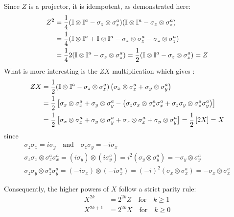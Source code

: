 \documentclass[a4paper,12pt]{article}
\begin{document}
\newpage

Since $ Z $ is a projector, it is idempotent, as demonstrated here: 
\begin{align}
	Z^{2} &= \frac{1}{4} (\mathbb{I} \otimes \mathbb{I}^{a} - \sigma_{z} \otimes \sigma_{z}^{a}) (\mathbb{I} \otimes \mathbb{I}^{a} - \sigma_{z} \otimes \sigma_{z}^{a}) \notag \\
	&= \frac{1}{4} (\mathbb{I} \otimes \mathbb{I}^{a} + \mathbb{I} \otimes \mathbb{I}^{a} - \sigma_{z} \otimes \sigma_{z}^{a} - \sigma_{z} \otimes \sigma_{z}^{a}) \notag \\
	&=  \frac{1}{4} 2 (\mathbb{I} \otimes \mathbb{I}^{a} - \sigma_{z} \otimes \sigma_{z}^{a}) =  \frac{1}{2} (\mathbb{I} \otimes \mathbb{I}^{a} - \sigma_{z} \otimes \sigma_{z}^{a}) = Z
\end{align}
What is more interesting is the $ ZX $ multiplication which gives : 
\begin{align}
	ZX &= \frac{1}{2} (\mathbb{I} \otimes \mathbb{I}^{a} - \sigma_{z} \otimes \sigma_{z}^{a}) \left( \sigma_{x} \otimes \sigma_{x}^{a} + \sigma_{y} \otimes \sigma_{y}^{a} \right) \notag \\
	& = \frac{1}{2} \left[\sigma_{x} \otimes \sigma_{x}^{a} + \sigma_{y} \otimes \sigma_{y}^{a} - \left( \sigma_{z} \sigma_{x} \otimes \sigma_{z}^{a} \sigma_{x}^{a} + \sigma_{z} \sigma_{y} \otimes \sigma_{z}^{a} \sigma_{y}^{a} \right)\right] \notag \\
	& = \frac{1}{2} \left[\sigma_{x} \otimes \sigma_{x}^{a} + \sigma_{y} \otimes \sigma_{y}^{a} + \sigma_{x} \otimes \sigma_{x}^{a} + \sigma_{y} \otimes \sigma_{y}^{a}\right] = \frac{1}{2} \left[2X\right] = X
\end{align}
since 
\begin{gather*}
	\sigma_{z} \sigma_{x} = i \sigma_{y} \quad \text{and} \quad \sigma_{z} \sigma_{y} = -i \sigma_{x} \\
	\sigma_{z}\sigma_{x} \otimes \sigma_{z}^{a}\sigma_{x}^{a} = (i\sigma_{y}) \otimes (i\sigma_{y}^{a}) = i^2 (\sigma_{y} \otimes \sigma_{y}^{a}) = -\sigma_{y} \otimes \sigma_{y}^{a} \\
	\sigma_{z}\sigma_{y} \otimes \sigma_{z}^{a}\sigma_{y}^{a} = (-i\sigma_{x}) \otimes (-i\sigma_{x}^{a}) = (-i)^2 (\sigma_{x} \otimes \sigma_{x}^{a}) = -\sigma_{x} \otimes \sigma_{x}^{a}
\end{gather*}

Consequently, the higher powers of $ X $ follow a strict parity rule:
\begin{align}
	X^{2k} &= 2^{2k} Z \quad \text{for} \quad k \geq 1 \label{eq:parity_X2k} \\
	X^{2k+1} &= 2^{2k} X \quad \text{for} \quad k \geq 0 \label{eq:parity_X2k+1}
\end{align}
\end{document}
